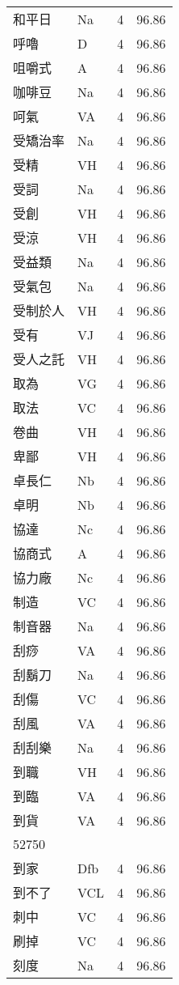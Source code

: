 \documentclass[twocolumn]{book}
\begin{document}
\begin{supertabular}{llrr}
和平日 & Na & 4 &  96.86\\
呼嚕 & D & 4 &  96.86\\
咀嚼式 & A & 4 &  96.86\\
咖啡豆 & Na & 4 &  96.86\\
呵氣 & VA & 4 &  96.86\\
受矯治率 & Na & 4 &  96.86\\
受精 & VH & 4 &  96.86\\
受詞 & Na & 4 &  96.86\\
受創 & VH & 4 &  96.86\\
受涼 & VH & 4 &  96.86\\
受益類 & Na & 4 &  96.86\\
受氣包 & Na & 4 &  96.86\\
受制於人 & VH & 4 &  96.86\\
受有 & VJ & 4 &  96.86\\
受人之託 & VH & 4 &  96.86\\
取為 & VG & 4 &  96.86\\
取法 & VC & 4 &  96.86\\
卷曲 & VH & 4 &  96.86\\
卑鄙 & VH & 4 &  96.86\\
卓長仁 & Nb & 4 &  96.86\\
卓明 & Nb & 4 &  96.86\\
協達 & Nc & 4 &  96.86\\
協商式 & A & 4 &  96.86\\
協力廠 & Nc & 4 &  96.86\\
制造 & VC & 4 &  96.86\\
制音器 & Na & 4 &  96.86\\
刮痧 & VA & 4 &  96.86\\
刮鬍刀 & Na & 4 &  96.86\\
刮傷 & VC & 4 &  96.86\\
刮風 & VA & 4 &  96.86\\
刮刮樂 & Na & 4 &  96.86\\
到職 & VH & 4 &  96.86\\
到臨 & VA & 4 &  96.86\\
到貨 & VA & 4 &  96.86\\
52750\\
到家 & Dfb & 4 &  96.86\\
到不了 & VCL & 4 &  96.86\\
刺中 & VC & 4 &  96.86\\
刷掉 & VC & 4 &  96.86\\
刻度 & Na & 4 &  96.86\\

\end{supertabular}
\end{document}
